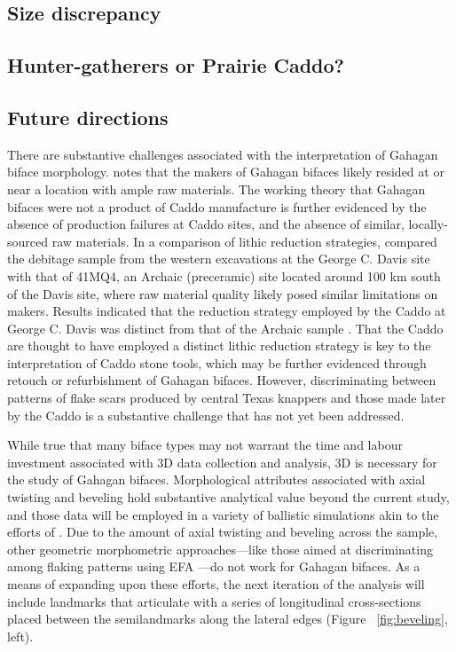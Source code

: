 \documentclass[review]{elsarticle}
\begin{document}
\subsection*{Size discrepancy}



\subsection*{Hunter-gatherers or Prairie Caddo?}



\subsection*{Future directions}

There are substantive challenges associated with the interpretation of Gahagan biface morphology. \citet{RN3684} notes that the makers of Gahagan bifaces likely resided at or near a location with ample raw materials. The working theory that Gahagan bifaces were not a product of Caddo manufacture is further evidenced by the absence of production failures at Caddo sites, and the absence of similar, locally-sourced raw materials. In a comparison of lithic reduction strategies, \citet{RN20701} compared the debitage sample from the western excavations at the George C. Davis site with that of 41MQ4, an Archaic (preceramic) site located around 100 km south of the Davis site, where raw material quality likely posed similar limitations on makers. Results indicated that the reduction strategy employed by the Caddo at George C. Davis was distinct from that of the Archaic sample \citep{RN20701}. That the Caddo are thought to have employed a distinct lithic reduction strategy is key to the interpretation of Caddo stone tools, which may be further evidenced through retouch or refurbishment of Gahagan bifaces. However, discriminating between patterns of flake scars produced by central Texas knappers and those made later by the Caddo is a substantive challenge that has not yet been addressed.

While true that many biface types may not warrant the time and labour investment associated with 3D data collection and analysis, 3D is necessary for the study of Gahagan bifaces. Morphological attributes associated with axial twisting and beveling hold substantive analytical value beyond the current study, and those data will be employed in a variety of ballistic simulations akin to the efforts of \citet{RN20857}. Due to the amount of axial twisting and beveling across the sample, other geometric morphometric approaches---like those aimed at discriminating among flaking patterns using EFA  \citep{RN253,RN4143,RN11975}---do not work for Gahagan bifaces. As a means of expanding upon these efforts, the next iteration of the analysis will include landmarks that articulate with a series of longitudinal cross-sections placed between the semilandmarks along the lateral edges (Figure ~\ref{fig:beveling}, left).
\end{document}
